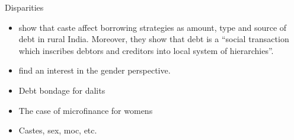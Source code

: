 \documentclass[a4paper, 11pt, onecolumn]{article}
\begin{document}

Disparities 
\begin{itemize}
\item \cite{Guerin2013a} show that caste affect borrowing strategies as amount, type and source of debt in rural India.
Moreover, they show that debt is a ``social transaction which inscribes debtors and creditors into local system of hierarchies''.
\item \cite{Reboul2021} find an interest in the gender perspective.
\item Debt bondage for dalits \citep{Guerin2020a}
\item The case of microfinance for womens \citep{Guerin2020b}
\item  Castes, sex, moc, etc.  \citep{Guerin2012a} \citep{Guerin2013a} \citep{Guerin2014} \citep{Reboul2021}
\end{itemize}



\end{document}
